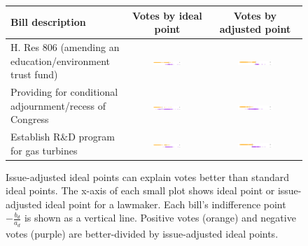 \begin{figure} 
  \caption{Issue-adjusted ideal points can explain votes better than
  standard ideal points.  The x-axis of each small plot shows ideal
  point or issue-adjusted ideal point for a lawmaker. Each bill's
  indifference point $-\frac{b_d}{a_d}$ is shown as a vertical
  line. Positive votes (orange) and negative votes (purple) are
  better-divided by issue-adjusted ideal points.}
  \label{fig:issue_adjustments}
  \hspace{-40pt} \begin{tabular}{|p{4.3cm}|c|c|}
\hline
\textbf{Bill description}
& \textbf{Votes by ideal point}
& \textbf{Votes by adjusted point} \\
\hline
H. Res 806 (amending an education/environment trust fund)
 & \includegraphics[width=0.4\textwidth]{chapter_inferring_issue_preferences/figures/3397_ideal_point_10.pdf}
 & \includegraphics[width=0.4\textwidth]{chapter_inferring_issue_preferences/figures/3397_adjusted_ideal_point_10.pdf} \\

Providing for conditional adjournment/recess of Congress
& \includegraphics[width=0.4\textwidth]{chapter_inferring_issue_preferences/figures/3397_ideal_point_9.pdf}
& \includegraphics[width=0.4\textwidth]{chapter_inferring_issue_preferences/figures/3397_adjusted_ideal_point_9.pdf} \\

Establish R\&D program for gas turbines 
& \includegraphics[width=0.4\textwidth]{chapter_inferring_issue_preferences/figures/3397_ideal_point_8.pdf}
& \includegraphics[width=0.4\textwidth]{chapter_inferring_issue_preferences/figures/3397_adjusted_ideal_point_8.pdf} \\


\end{tabular}
\end{figure}
